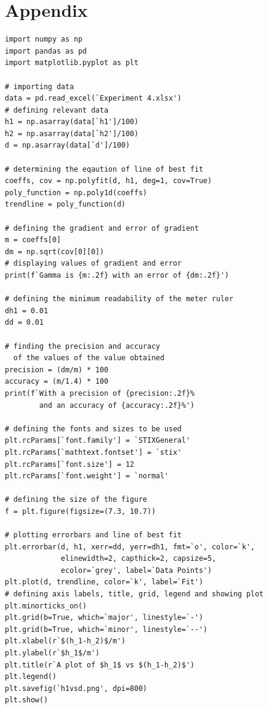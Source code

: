 \documentclass[12pt, a4paper]{article}
\begin{document}
\section*{Appendix}
\lstset{language=Python,
    showstringspaces=false,
    showtabs=false}
\begin{lstlisting}
import numpy as np
import pandas as pd
import matplotlib.pyplot as plt

# importing data
data = pd.read_excel(`Experiment 4.xlsx')
# defining relevant data
h1 = np.asarray(data[`h1']/100)
h2 = np.asarray(data[`h2']/100)
d = np.asarray(data[`d']/100)

# determining the eqaution of line of best fit
coeffs, cov = np.polyfit(d, h1, deg=1, cov=True)
poly_function = np.poly1d(coeffs)
trendline = poly_function(d)

# defining the gradient and error of gradient
m = coeffs[0]
dm = np.sqrt(cov[0][0])
# displaying values of gradient and error
print(f`Gamma is {m:.2f} with an error of {dm:.2f}')

# defining the minimum readability of the meter ruler
dh1 = 0.01
dd = 0.01

# finding the precision and accuracy 
  of the values of the value obtained
precision = (dm/m) * 100
accuracy = (m/1.4) * 100
print(f`With a precision of {precision:.2f}% 
        and an accuracy of {accuracy:.2f}%')

# defining the fonts and sizes to be used
plt.rcParams[`font.family'] = `STIXGeneral'
plt.rcParams[`mathtext.fontset'] = `stix'
plt.rcParams[`font.size'] = 12
plt.rcParams[`font.weight'] = `normal'

# defining the size of the figure
f = plt.figure(figsize=(7.3, 10.7))

# plotting errorbars and line of best fit
plt.errorbar(d, h1, xerr=dd, yerr=dh1, fmt=`o', color=`k',
             elinewidth=2, capthick=2, capsize=5,
             ecolor=`grey', label=`Data Points')
plt.plot(d, trendline, color=`k', label=`Fit')
# defining axis labels, title, grid, legend and showing plot
plt.minorticks_on()
plt.grid(b=True, which=`major', linestyle=`-')
plt.grid(b=True, which=`minor', linestyle=`--')
plt.xlabel(r`$(h_1-h_2)$/m')
plt.ylabel(r`$h_1$/m')
plt.title(r`A plot of $h_1$ vs $(h_1-h_2)$')
plt.legend()
plt.savefig(`h1vsd.png', dpi=800)
plt.show()


\end{lstlisting}
\end{document}
